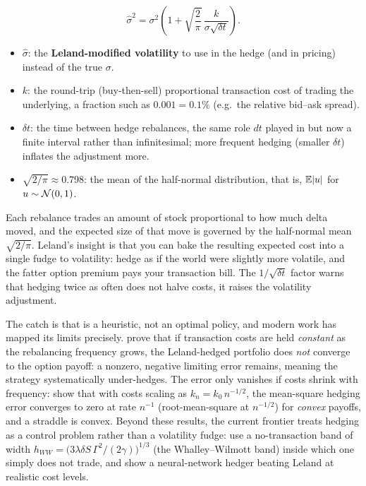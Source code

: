 \begin{equation}
\label{eq:ivrv:leland-vol}
\hat{\sigma}^2 = \sigma^2\left(1 + \sqrt{\frac{2}{\pi}}\,\frac{k}{\sigma\sqrt{\delta t}}\right).
\end{equation}
\begin{itemize}
  \item $\hat{\sigma}$: the \textbf{Leland-modified volatility} to use in the hedge (and in pricing) instead of the true $\sigma$.
  \item $k$: the round-trip (buy-then-sell) proportional transaction cost of trading the underlying, a fraction such as $0.001 = 0.1\%$ (e.g.\ the relative bid--ask spread).
  \item $\delta t$: the time between hedge rebalances, the same role $dt$ played in  but now a finite interval rather than infinitesimal; more frequent hedging (smaller $\delta t$) inflates the adjustment more.
  \item $\sqrt{2/\pi} \approx 0.798$: the mean of the half-normal distribution, that is, $\mathbb{E}|u|$ for $u \sim \mathcal{N}(0,1)$.
\end{itemize}

\begin{intuition}
Each rebalance trades an amount of stock proportional to how much delta moved, and the expected size of that move is governed by the half-normal mean $\sqrt{2/\pi}$. Leland's insight is that you can bake the resulting expected cost into a single fudge to volatility: hedge as if the world were slightly more volatile, and the fatter option premium pays your transaction bill. The $1/\sqrt{\delta t}$ factor warns that hedging twice as often does not halve costs, it raises the volatility adjustment.
\end{intuition}

The catch is that  is a heuristic, not an optimal policy, and modern work has mapped its limits precisely. \citet{KabanovSafarian1997} prove that if transaction costs are held \emph{constant} as the rebalancing frequency grows, the Leland-hedged portfolio does \emph{not} converge to the option payoff: a nonzero, negative limiting error remains, meaning the strategy systematically under-hedges. The error only vanishes if costs shrink with frequency: \citet{LepinetteKabanov2010} show that with costs scaling as $k_n = k_0\,n^{-1/2}$, the mean-square hedging error converges to zero at rate $n^{-1}$ (root-mean-square at $n^{-1/2}$) for \emph{convex} payoffs, and a straddle is convex. Beyond these results, the current frontier treats hedging as a control problem rather than a volatility fudge: \citet{ArzelLehdili2026} use a no-transaction band of width $h_{WW} = \big(3\lambda\delta S\,\Gamma^2/(2\gamma)\big)^{1/3}$ (the Whalley--Wilmott band) inside which one simply does not trade, and \citet{BrugiereTurinici2025} show a neural-network hedger beating Leland at realistic cost levels.


